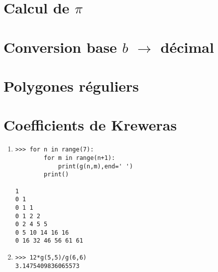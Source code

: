 \documentclass[11pt,a4paper]{article}
\begin{document}

\section{Calcul de $\pi$}


\section{Conversion base $b$ $\rightarrow$ décimal}


\section{Polygones réguliers}



\section{Coefficients de Kreweras}
%

\begin{minipage}[t]{7cm}
\begin{enumerate}
\item 
\begin{Verbatim}
>>> for n in range(7):
        for m in range(n+1):
            print(g(n,m),end=' ')
        print()

1 
0 1 
0 1 1 
0 1 2 2 
0 2 4 5 5 
0 5 10 14 16 16 
0 16 32 46 56 61 61 
\end{Verbatim}
\end{enumerate}
\end{minipage}
\hfill
\begin{minipage}[t]{7cm}
\begin{enumerate}\setcounter{enumi}{1}
\item  
\begin{Verbatim}
>>> 12*g(5,5)/g(6,6)
3.1475409836065573

\end{Verbatim}
\end{enumerate}
\end{minipage}
\end{document}
